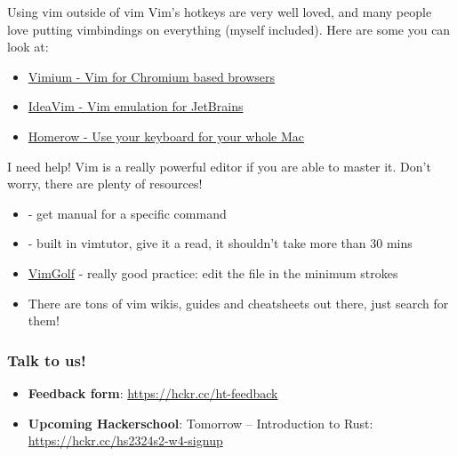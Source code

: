 \documentclass[12pt]{beamer}
\begin{document}
\begin{frame}{Using vim outside of vim}
    Vim's hotkeys are very well loved, and many people love putting vimbindings on everything (myself included).
    Here are some you can look at:

    \begin{itemize}
        \item \href{https://chrome.google.com/webstore/detail/vimium/dbepggeogbaibhgnhhndojpepiihcmeb?hl=en}{Vimium - Vim for Chromium based browsers}
        \item \href{https://plugins.jetbrains.com/plugin/164-ideavim}{IdeaVim - Vim emulation for JetBrains}
        \item \href{https://www.homerow.app}{Homerow - Use your keyboard for your whole Mac}
    \end{itemize}{}
\end{frame}{}

\begin{frame}{I need help!}
    Vim is a really powerful editor if you are able to master it. Don't worry, there are plenty of resources!
    \begin{itemize}
        \item {} - get manual for a specific command
        \item {} - built in vimtutor, give it a read, it shouldn't take more than 30 mins
        \item \href{https://www.vimgolf.com}{VimGolf} - really good practice: edit the file in the minimum strokes
        \item There are tons of vim wikis, guides and cheatsheets out there, just search for them!
    \end{itemize}{}
\end{frame}{}

\begin{frame}
    \frametitle{Talk to us!}
    \begin{itemize}
        \item \textbf{Feedback form}: \url{https://hckr.cc/ht-feedback}

        \item \textbf{Upcoming Hackerschool}:
              Tomorrow -- Introduction to Rust: \url{https://hckr.cc/hs2324s2-w4-signup}
    \end{itemize}
\end{frame}
\end{document}
